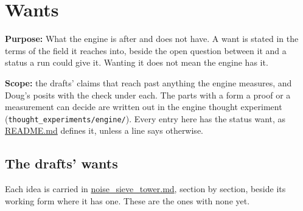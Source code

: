 \chapter{\texorpdfstring{Wants}{Wants}}
\label{chap:wants}

\textbf{Purpose:} What the engine is after and does not have. A want is stated in the terms of the field it reaches into, beside the open question between it and a status a run could give it. Wanting it does not mean the engine has it.

\textbf{Scope:} the drafts' claims that reach past anything the engine measures, and Doug's posits with the check under each. The parts with a form a proof or a measurement can decide are written out in the engine thought experiment (\texttt{thought\_\allowbreak{}experiments/\allowbreak{}engine/\allowbreak{}}). Every entry here has the status want, as \hyperref[chap:readme]{README.md} defines it, unless a line says otherwise.

\section{\texorpdfstring{The drafts' wants}{The drafts' wants}}

Each idea is carried in \hyperref[chap:noise-sieve-tower]{noise\_\allowbreak{}sieve\_\allowbreak{}tower.md}, section by section, beside its working form where it has one. These are the ones with none yet.

